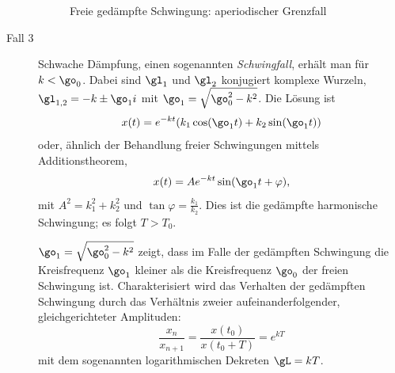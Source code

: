 \documentclass[%
11pt,%
twoside,%
titlepage,%
german,%
headsepline%
]{scrartcl}
\begin{document}
\begin{description}
\begin{figure}
\begin{center}
\end{center}
\caption{Freie ged\"ampfte Schwingung: aperiodischer Grenzfall}
\end{figure}

\item[Fall 3] Schwache D\"ampfung, einen sogenannten \emph{Schwingfall}, erh\"alt man f\"ur $k<\go_0$.
Dabei sind $\gl_1$ und $\gl_2$ konjugiert komplexe Wurzeln, $\gl_{1,2}=-k\pm\go_1i$ mit $\go_1=\sqrt{\go_0^2-k^2}$. Die L\"osung ist
$$x(t)=e^{-kt}(k_1\cos(\go_1 t)+k_2\sin(\go_1 t))$$
oder, \"ahnlich der Behandlung freier Schwingungen mittels Additionstheorem,
$$x(t)=Ae^{-kt}\sin(\go_1 t+\varphi),$$
mit $A^2=k_1^2+k_2^2$ und $\tan\varphi=\frac{k_1}{k_2}$. Dies ist die ged\"ampfte harmonische Schwingung; es folgt $T>T_0$.

$\go_1=\sqrt{\go_0^2-k^2}$ zeigt, dass im Falle der ged\"ampften Schwingung die Kreisfrequenz $\go_1$ kleiner als die Kreisfrequenz $\go_0$ der freien Schwingung ist. Charakterisiert wird das Verhalten der ged\"ampften Schwingung durch das Verh\"altnis zweier aufeinanderfolgender, gleichgerichteter Amplituden:
$$\frac{x_n}{x_{n+1}}=\frac{x(t_0)}{x(t_0+T)}=e^{kT}$$
mit dem sogenannten logarithmischen Dekreten $\gL=kT$.


\end{description}
\end{document}
